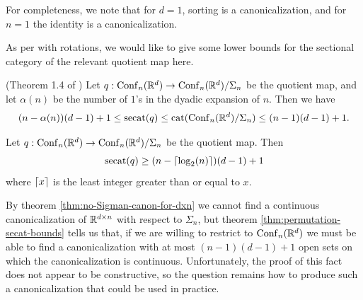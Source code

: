 \begin{remark}
    For completeness, we note that for $d = 1$, sorting is a canonicalization, and for $n = 1$ the identity is a canonicalization.
\end{remark}

As per with rotations, we would like to give some lower bounds for the sectional category of the relevant quotient map here.

\begin{theorem}\label{thm:permutation-secat-bounds}
    (Theorem 1.4 of \cite{roth2008configurationfibrations})
    Let $q : \operatorname{Conf}_n(\mathbb{R}^d) \to \operatorname{Conf}_n(\mathbb{R}^d) / \Sigma_n$ be the quotient map, and let $\alpha(n)$ be the number of $1$'s in the dyadic expansion of $n$.
    Then we have 
    \[
        (n - \alpha(n))(d-1) + 1
        \leq \operatorname{secat}(q)
        \leq \operatorname{cat}(\operatorname{Conf}_n(\mathbb{R}^d)/\Sigma_n)
        \leq (n-1)(d-1) + 1.
    \]
\end{theorem}

\begin{corollary}
    Let $q : \operatorname{Conf}_n(\mathbb{R}^d) \to \operatorname{Conf}_n(\mathbb{R}^d) / \Sigma_n$ be the quotient map.
    Then
    \[
        \operatorname{secat}(q) \geq (n - \left \lceil \log_2(n) \right \rceil)(d-1) + 1
    \]
    where $\left \lceil x \right \rceil$ is the least integer greater than or equal to $x$.
\end{corollary}

By theorem \ref{thm:no-Sigman-canon-for-dxn} we cannot find a continuous canonicalization of $\mathbb{R}^{d \times n}$ with respect to $\Sigma_n$, but theorem \ref{thm:permutation-secat-bounds} tells us that, if we are willing to restrict to $\operatorname{Conf}_n(\mathbb{R}^d)$ we must be able to find a canonicalization with at most $(n-1)(d-1)+1$ open sets on which the canonicalization is continuous.
Unfortunately, the proof of this fact does not appear to be constructive, so the question remains how to produce such a canonicalization that could be used in practice.

